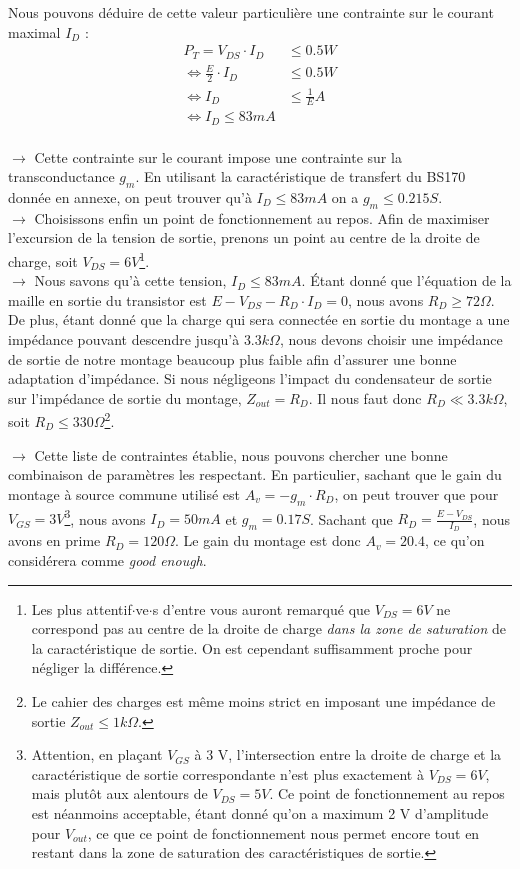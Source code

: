 \documentclass{../template/labo}
\begin{document}
{Nous pouvons déduire de cette valeur particulière une contrainte sur le courant maximal $I_D$ :
\begin{align*}
P_T = V_{DS} \cdot I_D &\leq 0.5 W \\
\Leftrightarrow \frac{E}{2} \cdot I_D & \leq 0.5 W \\
\Leftrightarrow I_D & \leq \frac{1}{E} A \\
\Leftrightarrow \boxed{I_D \leq 83 mA}
\end{align*}
~\\

$\rightarrow$ Cette contrainte sur le courant impose une contrainte sur la transconductance $g_m$.
En utilisant la caractéristique de transfert du BS170 donnée en annexe, on peut trouver qu'à $I_D \leq 83 mA$ on a $\boxed{g_m \leq 0.215 S}$.\\

$\rightarrow$ Choisissons enfin un point de fonctionnement au repos.
Afin de maximiser l'excursion de la tension de sortie, prenons un point au centre de la droite de charge, soit $\boxed{V_{DS} = 6 V}$\footnote{Les plus attentif$\cdot$ve$\cdot$s d'entre vous auront remarqué que $V_{DS} = 6 V$ ne correspond pas au centre de la droite de charge \textit{dans la zone de saturation} de la caractéristique de sortie. On est cependant suffisamment proche pour négliger la différence.}.\\

$\rightarrow$ Nous savons qu'à cette tension, $I_D \leq 83 mA$.
Étant donné que l'équation de la maille en sortie du transistor est $E - V_{DS} - R_D \cdot I_D = 0$, nous avons $\boxed{R_D \geq 72 \Omega}$.
De plus, étant donné que la charge qui sera connectée en sortie du montage a une impédance pouvant descendre jusqu'à $3.3 k\Omega$, nous devons choisir une impédance de sortie de notre montage beaucoup plus faible afin d'assurer une bonne adaptation d'impédance.
Si nous négligeons l'impact du condensateur de sortie sur l'impédance de sortie du montage, $Z_{out} = R_D$.
Il nous faut donc $R_D \ll 3.3 k\Omega$, soit $\boxed{R_D \leq 330 \Omega}$\footnote{Le cahier des charges est même moins strict en imposant une impédance de sortie $Z_{out} \leq 1 k\Omega$.}.

$\rightarrow$ Cette liste de contraintes établie, nous pouvons chercher une bonne combinaison de paramètres les respectant.
En particulier, sachant que le gain du montage à source commune utilisé est $A_v = -g_m \cdot R_D$, on peut trouver que pour $\boxed{V_{GS} = 3 V}$\footnote{Attention, en plaçant $V_{GS}$ à 3 V, l'intersection entre la droite de charge et la caractéristique de sortie correspondante n'est plus exactement à $V_{DS} = 6 V$, mais plutôt aux alentours de $V_{DS} = 5 V$. Ce point de fonctionnement au repos est néanmoins acceptable, étant donné qu'on a maximum 2 V d'amplitude pour $V_{out}$, ce que ce point de fonctionnement nous permet encore tout en restant dans la zone de saturation des caractéristiques de sortie.}, nous avons $\boxed{I_D = 50 mA}$ et $\boxed{g_m = 0.17 S}$. Sachant que $R_D = \frac{E - V_{DS}}{I_D}$, nous avons en prime $\boxed{R_D = 120 \Omega}$.
Le gain du montage est donc $\boxed{A_v = 20.4}$, ce qu'on considérera comme \textit{good enough}.\\

}
\end{document}
